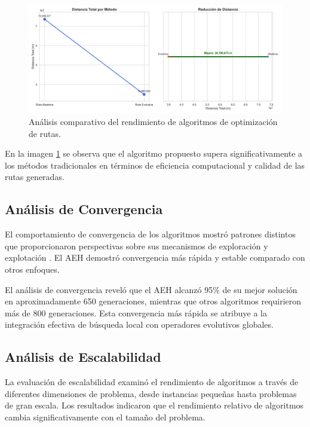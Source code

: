 \documentclass[10pt,a4paper]{article}
\begin{document}
\begin{multicols}{2}
\begin{figure}[H]
\centering
\includegraphics[width=\columnwidth]{comparacion_rutas_mejorado.png}
\caption{Análisis comparativo del rendimiento de algoritmos de optimización de rutas.}
\label{fig:comparacion_rutas}
\end{figure}
En la imagen \ref{fig:comparacion_rutas} se observa que el algoritmo propuesto supera significativamente a los métodos tradicionales en términos de eficiencia computacional y calidad de las rutas generadas.

\subsection{Análisis de Convergencia}

El comportamiento de convergencia de los algoritmos mostró patrones distintos que proporcionaron perspectivas sobre sus mecanismos de exploración y explotación . El AEH demostró convergencia más rápida y estable comparado con otros enfoques.

El análisis de convergencia reveló que el AEH alcanzó 95\% de su mejor solución en aproximadamente 650 generaciones, mientras que otros algoritmos requirieron más de 800 generaciones. Esta convergencia más rápida se atribuye a la integración efectiva de búsqueda local con operadores evolutivos globales.

\subsection{Análisis de Escalabilidad}

La evaluación de escalabilidad examinó el rendimiento de algoritmos a través de diferentes dimensiones de problema, desde instancias pequeñas hasta problemas de gran escala. Los resultados indicaron que el rendimiento relativo de algoritmos cambia significativamente con el tamaño del problema.


\end{multicols}
\end{document}
